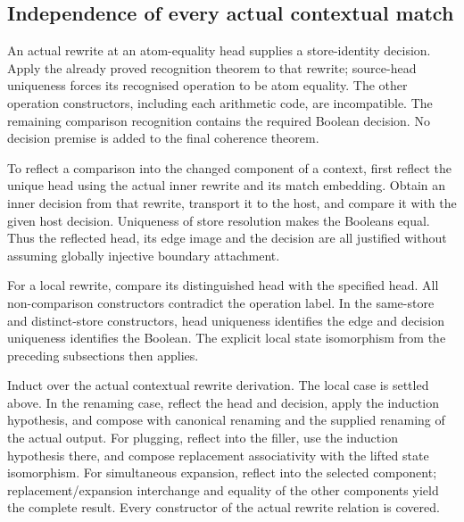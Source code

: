 

\subsection{Independence of every actual contextual match}

An actual rewrite at an atom-equality head supplies a store-identity
decision. Apply the already proved recognition theorem to that rewrite;
source-head uniqueness forces its recognised operation to be atom equality.
The other operation constructors, including each arithmetic code, are
incompatible. The remaining comparison recognition contains the required
Boolean decision. No decision premise is added to the final coherence theorem.


To reflect a comparison into the changed component of a context, first
reflect the unique head using the actual inner rewrite and its match
embedding. Obtain an inner decision from that rewrite, transport it to the
host, and compare it with the given host decision. Uniqueness of store
resolution makes the Booleans equal. Thus the reflected head, its edge image
and the decision are all justified without assuming globally injective
boundary attachment.


For a local rewrite, compare its distinguished head with the specified
head. All non-comparison constructors contradict the operation label.
In the same-store and distinct-store constructors, head uniqueness identifies
the edge and decision uniqueness identifies the Boolean. The explicit local
state isomorphism from the preceding subsections then applies.


Induct over the actual contextual rewrite derivation. The local case is
settled above. In the renaming case, reflect the head and decision, apply the
induction hypothesis, and compose with canonical renaming and the supplied
renaming of the actual output. For plugging, reflect into the filler, use the
induction hypothesis there, and compose replacement associativity with the
lifted state isomorphism. For simultaneous expansion, reflect into the selected
component; replacement/expansion interchange and equality of the other
components yield the complete result. Every constructor of the actual rewrite
relation is covered.

